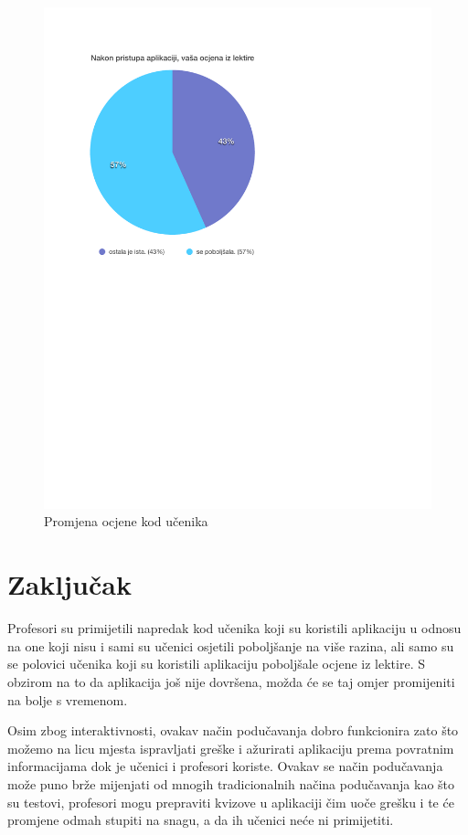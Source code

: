 \documentclass[11pt]{scrreprt}
\begin{document}
\begin{figure}[H]
  \includegraphics[width=\textwidth, clip=true, trim=0 2.5cm 0 0]{student/grades}
  \caption{Promjena ocjene kod učenika}
  \label{fig:student/grades}
\end{figure}

\chapter{Zaključak}

Profesori su primijetili napredak kod učenika koji su koristili aplikaciju u
odnosu na one koji nisu i sami su učenici osjetili poboljšanje na više razina,
ali samo su se polovici učenika koji su koristili aplikaciju poboljšale ocjene
iz lektire. S obzirom na to da aplikacija još nije dovršena, možda će se taj
omjer promijeniti na bolje s vremenom.

Osim zbog interaktivnosti, ovakav način podučavanja dobro funkcionira zato što
možemo na licu mjesta ispravljati greške i ažurirati aplikaciju prema povratnim
informacijama dok je učenici i profesori koriste. Ovakav se način podučavanja
može puno brže mijenjati od mnogih tradicionalnih načina podučavanja kao što su
testovi, profesori mogu prepraviti kvizove u aplikaciji čim uoče grešku i te će
promjene odmah stupiti na snagu, a da ih učenici neće ni primijetiti.
\end{document}
